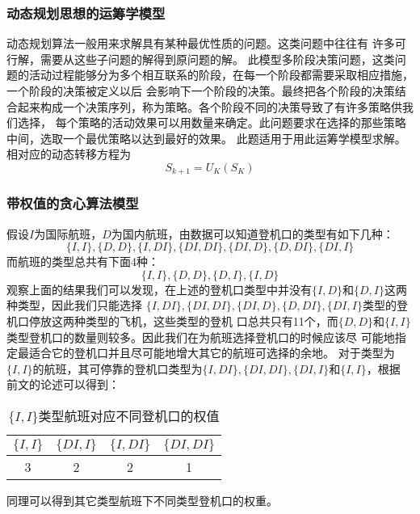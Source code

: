 \documentclass[bwprint]{gmcmthesis}
\begin{document}
\subsubsection{动态规划思想的运筹学模型}
动态规划算法一般用来求解具有某种最优性质的问题。这类问题中往往有
许多可行解，需要从这些子问题的解得到原问题的解。
此模型多阶段决策问题，这类问题的活动过程能够分为多个相互联系的阶段，在每一个阶段都需要采取相应措施，一个阶段的决策被定义以后
会影响下一个阶段的决策。最终把各个阶段的决策结合起来构成一个决策序列，称为策略。各个阶段不同的决策导致了有许多策略供我们选择，
每个策略的活动效果可以用数量来确定。此问题要求在选择的那些策略中间，选取一个最优策略以达到最好的效果。 此题适用于用此运筹学模型求解。
相对应的动态转移方程为
\begin{equation}
S_{k+1}=U_{K}\left ( S_{K} \right )
\end{equation}

\subsubsection{带权值的贪心算法模型}
假设$I$为国际航班，$D$为国内航班，由数据可以知道登机口的类型有如下几种：
\begin{equation}
    \{I,I\},\{D,D\},\{I,DI\},\{DI,DI\},\{DI,D\},\{D,DI\},\{DI,I\}
\end{equation}
而航班的类型总共有下面4种：
\begin{equation}
    \{I,I\},\{D,D\},\{D,I\},\{I,D\}
\end{equation}
观察上面的结果我们可以发现，在上述的登机口类型中并没有$\{I,D\}$和$\{D,I\}$这两种类型，因此我们只能选择
$\{I,DI\},\{DI,DI\},\{DI,D\},\{D,DI\},\{DI,I\}$类型的登机口停放这两种类型的飞机，这些类型的登机
口总共只有11个，而$\{D,D\}$和$\{I,I\}$类型登机口的数量则较多。因此我们在为航班选择登机口的时候应该尽
可能地指定最适合它的登机口并且尽可能地增大其它的航班可选择的余地。
对于类型为$\{I,I\}$的航班，其可停靠的登机口类型为$\{I,DI\},\{DI,DI\},\{DI,I\}$和$\{I,I\}$，根据
前文的论述可以得到：
\begin{table*}[!hbp]
\centering
\caption{$\{I, I\}$类型航班对应不同登机口的权值}
\begin{tabular}{|c|c|c|c|}
    \hline  
    $\{I, I\}$ & $\{DI, I\}$ & $\{I, DI\}$ & $\{DI, DI\}$\\
    \hline 
    3&2&2&1\\
    \hline 
\end{tabular}
\end{table*}


同理可以得到其它类型航班下不同类型登机口的权重。
\end{document}
